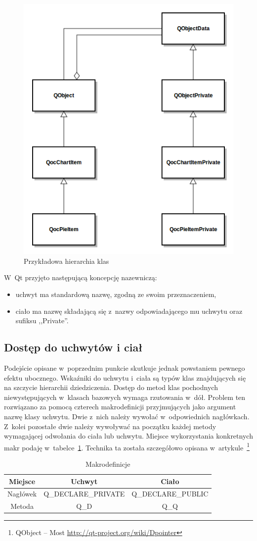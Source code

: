 \begin{figure}
\centering
\caption{Przykładowa hierarchia klas}\label{rys:dpointer}
\includegraphics[scale=0.8]{img/dpointer.png}
\end{figure}

W~Qt przyjęto następującą koncepcję nazewniczą:
\begin{itemize}
\item{uchwyt ma standardową nazwę, zgodną ze swoim przeznaczeniem,}
\item{ciało ma nazwę składającą się z~nazwy odpowiadającego mu uchwytu oraz sufiksu ,,Private''.}
\end{itemize}


\subsection{Dostęp do uchwytów i ciał}
Podejście opisane w~poprzednim punkcie skutkuje jednak powstaniem pewnego efektu ubocznego.
Wskaźniki do uchwytu i~ciała są typów klas znajdujących się na szczycie hierarchii dziedziczenia. Dostęp do metod klas pochodnych niewystępujących w~klasach bazowych wymaga rzutowania w~dół. 
Problem ten rozwiązano za pomocą czterech makrodefinicji przyjmujących jako argument nazwę klasy uchwytu. Dwie z~nich należy wywołać w~odpowiednich nagłówkach. Z~kolei pozostałe dwie należy wywoływać na początku każdej metody wymagającej odwołania do ciała lub uchwytu. Miejsce wykorzystania konkretnych makr podaję w~tabelce~\ref{tab:makra}. Technika ta została szczegółowo opisana w~artykule~\footnote{QObject -- Most \url{http://qt-project.org/wiki/Dpointer}}

\begin{table}[h]\footnotesize
\centering
\caption{Makrodefinicje}
\label{tab:makra}
\begin{tabular}{|c|c|c|}
\hline
Miejsce & Uchwyt & Ciało\\
\hline
Nagłówek & Q\_DECLARE\_PRIVATE & Q\_DECLARE\_PUBLIC\\
\hline
Metoda & Q\_D & Q\_Q\\
\hline
\end{tabular}
\end{table}
